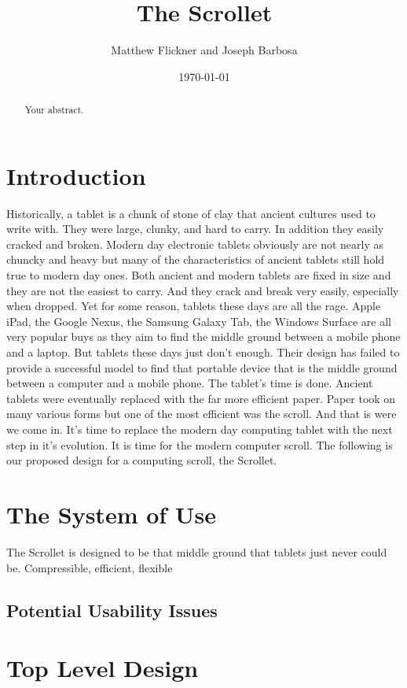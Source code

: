 \documentclass[a4paper]{article}
\title{The Scrollet}
\author{Matthew Flickner and Joseph Barbosa}
\date{\today}
\begin{document}
\maketitle

\begin{abstract}
Your abstract.
\end{abstract}

\section{Introduction}
Historically, a tablet is a chunk of stone of clay that ancient cultures used to write with. They were large, clunky, and hard to carry. In addition they easily cracked and broken. Modern day electronic tablets obviously are not nearly as chuncky and heavy but many of the characteristics of ancient tablets still hold true to modern day ones. Both ancient and modern tablets are fixed in size and they are not the easiest to carry. And they crack and break very easily, especially when dropped. Yet for some reason, tablets these days are all the rage. Apple iPad, the Google Nexus, the Samsung Galaxy Tab, the Windows Surface are all very popular buys as they aim to find the middle ground between a mobile phone and a laptop. But tablets these days just don't enough. Their design has failed to provide a successful model to find that portable device that is the middle ground between a computer and a mobile phone. The tablet's time is done. Ancient tablets were eventually replaced with the far more efficient paper. Paper took on many various forms but one of the most efficient was the scroll. And that is were we come in. It's time to replace the modern day computing tablet with the next step in it's evolution. It is time for the modern computer scroll. The following is our proposed design for a computing scroll, the Scrollet.

\section{The System of Use}
\label{sec:system}
The Scrollet is designed to be that middle ground that tablets just never could be. Compressible, efficient, flexible 
\subsection{Potential Usability Issues}

\section{Top Level Design}
\end{document}
